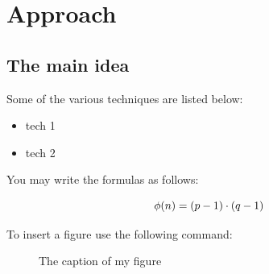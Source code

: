 \documentclass[a4paper]{usiinfbachelorproject}
\begin{document}
\section{\textbf{Approach}}
\subsection{\textbf{The main idea}}
Some of the various techniques are listed below:

\begin{itemize}
	\item tech 1
	\item tech 2
\end{itemize}

\noindent You may write the formulas as follows:

\begin{equation}
	\phi(n) = (p-1) \cdot (q-1)\\
\end{equation}




To insert a figure use the following command:

\begin{figure}[h!]
	\caption{The caption of my figure}\label{fig:flower}
\end{figure}
\end{document}
